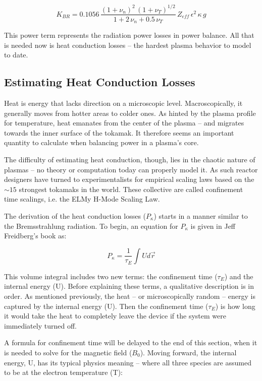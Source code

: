 \documentclass[11pt]{book}
\begin{document}
\begin{equation}
	K_{BR} = 0.1056 \, \frac{ (1+\nu_n)^2 \, (1+\nu_T)^{1/2} }{1+2 \, \nu_n + 0.5 \, \nu_T} \, Z_{eff} \, \epsilon^2 \, \kappa \, g
\end{equation}

This power term represents the radiation power losses in power balance. All that is needed now is heat conduction losses -- the hardest plasma behavior to model to date.

\subsection{Estimating Heat Conduction Losses}

Heat is energy that lacks direction on a microscopic level. Macroscopically, it generally moves from hotter areas to colder ones. As hinted by the plasma profile for temperature, heat emanates from the center of the plasma -- and migrates towards the inner surface of the tokamak. It therefore seems an important quantity to calculate when balancing power in a plasma's core.

The difficulty of estimating heat conduction, though, lies in the chaotic nature of plasmas -- no theory or computation today can properly model it. As such reactor designers have turned to experimentalists for empirical scaling laws based on the $\sim15$ strongest tokamaks in the world. These collective are called confinement time scalings, i.e. the ELMy H-Mode Scaling Law.

The derivation of the heat conduction losses ($P_\kappa$) starts in a manner similar to the Bremsstrahlung radiation. To begin, an equation for $P_\kappa$ is given in Jeff Freidberg's book as:

\begin{equation}
	P_\kappa = \frac{1}{\tau_E} \int U d \vec r
\end{equation}

This volume integral includes two new terms: the confinement time ($\tau_E$) and the internal energy (U). Before explaining these terms, a qualitative description is in order. As mentioned previously, the heat -- or microscopically random -- energy is captured by the internal energy (U). Then the confinement time ($\tau_E$) is how long it would take the heat to completely leave the device if the system were immediately turned off.

A formula for confinement time will be delayed to the end of this section, when it is needed to solve for the magnetic field ($B_0$). Moving forward, the internal energy, U, has its typical physics meaning -- where all three species are assumed to be at the electron temperature (T):
\end{document}
